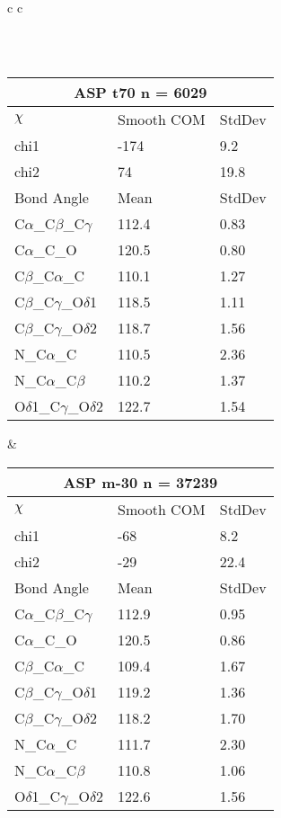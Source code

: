 \begin{longtable}{ c c }
\begin{tabular}{ l l l }
  \end{tabular}
  \\
  \begin{tabular}{ l l l }
  \toprule
  \multicolumn{3}{c}{ASP \textbf{t70} n = 6029} \\ \toprule
  $\chi$       & Smooth COM & StdDev \\ \midrule
  chi1 & -174 & 9.2 \\ 
  chi2 & 74 & 19.8 \\ \midrule
  Bond Angle   & Mean     & StdDev \\ \midrule
  C$\alpha$\_C$\beta$\_C$\gamma$ & 112.4 & 0.83\\
  C$\alpha$\_C\_O & 120.5 & 0.80\\
  C$\beta$\_C$\alpha$\_C & 110.1 & 1.27\\
  C$\beta$\_C$\gamma$\_O$\delta$1 & 118.5 & 1.11\\
  C$\beta$\_C$\gamma$\_O$\delta$2 & 118.7 & 1.56\\
  N\_C$\alpha$\_C & 110.5 & 2.36\\
  N\_C$\alpha$\_C$\beta$ & 110.2 & 1.37\\
  O$\delta$1\_C$\gamma$\_O$\delta$2 & 122.7 & 1.54\\
  \bottomrule
  \end{tabular}
  &
  \begin{tabular}{ l l l }
  \toprule
  \multicolumn{3}{c}{ASP \textbf{m-30} n = 37239} \\ \toprule
  $\chi$       & Smooth COM & StdDev \\ \midrule
  chi1 & -68 & 8.2 \\ 
  chi2 & -29 & 22.4 \\ \midrule
  Bond Angle   & Mean     & StdDev \\ \midrule
  C$\alpha$\_C$\beta$\_C$\gamma$ & 112.9 & 0.95\\
  C$\alpha$\_C\_O & 120.5 & 0.86\\
  C$\beta$\_C$\alpha$\_C & 109.4 & 1.67\\
  C$\beta$\_C$\gamma$\_O$\delta$1 & 119.2 & 1.36\\
  C$\beta$\_C$\gamma$\_O$\delta$2 & 118.2 & 1.70\\
  N\_C$\alpha$\_C & 111.7 & 2.30\\
  N\_C$\alpha$\_C$\beta$ & 110.8 & 1.06\\
  O$\delta$1\_C$\gamma$\_O$\delta$2 & 122.6 & 1.56\\
  \bottomrule
  \end{tabular}
  \\
  
\end{longtable}


